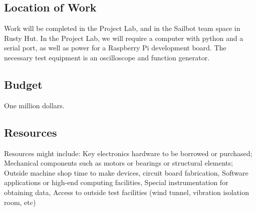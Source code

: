 \subsection{\label{sec:location-of-word}Location of Work}
Work will be completed in the Project Lab, and in the Sailbot team space in Rusty Hut. In the Project Lab, we will require a computer with python and a serial port, as well as power for a Raspberry Pi development board. The necessary test equipment is an oscilloscope and function generator.

\subsection{\label{sec:budget}Budget}
One million dollars.

\subsection{\label{sec:resources}Resources}
Resources might include:
    Key electronics hardware to be borrowed or purchased;
    Mechanical components such as motors or bearings or structural elements;
    Outside machine shop time to make devices, circuit board fabrication,
    Software applications or high-end computing facilities,
    Special instrumentation for obtaining data,
    Access to outside test facilities (wind tunnel, vibration isolation room, etc)
